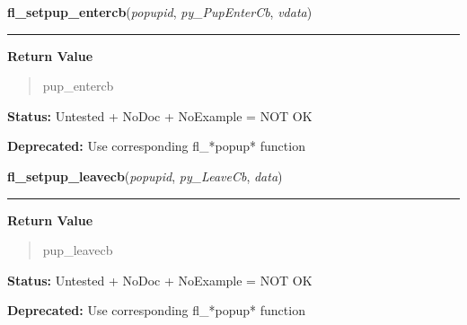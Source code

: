 \hspace{.8\funcindent}\begin{boxedminipage}{\funcwidth}

    \raggedright \textbf{fl\_setpup\_entercb}(\textit{popupid}, \textit{py\_PupEnterCb}, \textit{vdata})

    \vspace{-1.5ex}

    \rule{\textwidth}{0.5\fboxrule}
\setlength{\parskip}{2ex}
\setlength{\parskip}{1ex}
      \textbf{Return Value}
    \vspace{-1ex}

      \begin{quote}
      pup\_entercb

      \end{quote}

\textbf{Status:} Untested + NoDoc + NoExample = NOT OK



\textbf{Deprecated:} Use corresponding fl\_*popup* function



    \end{boxedminipage}

    \label{xformslib:deprecated:fl_setpup_leavecb}

    \vspace{0.5ex}

\hspace{.8\funcindent}\begin{boxedminipage}{\funcwidth}

    \raggedright \textbf{fl\_setpup\_leavecb}(\textit{popupid}, \textit{py\_LeaveCb}, \textit{data})

    \vspace{-1.5ex}

    \rule{\textwidth}{0.5\fboxrule}
\setlength{\parskip}{2ex}
\setlength{\parskip}{1ex}
      \textbf{Return Value}
    \vspace{-1ex}

      \begin{quote}
      pup\_leavecb

      \end{quote}

\textbf{Status:} Untested + NoDoc + NoExample = NOT OK



\textbf{Deprecated:} Use corresponding fl\_*popup* function



    \end{boxedminipage}

